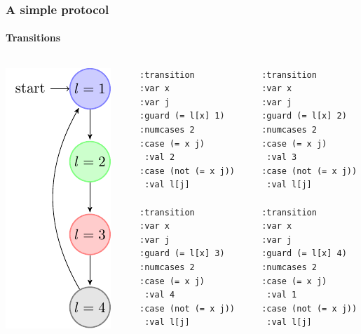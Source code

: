\begin{frame}[fragile]
  \frametitle{A simple protocol}
  \framesubtitle{Transitions}

  \begin{columns}
  \begin{column}{0.3\textwidth}
  \centering
  \includegraphics{pictures/demo-prot1-fig}
  \end{column}
  \begin{column}{0.7\textwidth}
  
\begin{columns}
\begin{column}{0.35\textwidth}
 {\scriptsize 
  \begin{verbatim}
  :transition
  :var x
  :var j
  :guard (= l[x] 1)
  :numcases 2
  :case (= x j)
   :val 2
  :case (not (= x j))
   :val l[j]

  :transition
  :var x
  :var j
  :guard (= l[x] 3)
  :numcases 2
  :case (= x j)
   :val 4
  :case (not (= x j))
   :val l[j]
 \end{verbatim}
 }
\end{column}
\begin{column}{0.35\textwidth}
 {\scriptsize 
  \begin{verbatim}
  :transition
  :var x
  :var j
  :guard (= l[x] 2)
  :numcases 2
  :case (= x j)
   :val 3
  :case (not (= x j))
   :val l[j]
  
  :transition
  :var x
  :var j
  :guard (= l[x] 4)
  :numcases 2
  :case (= x j)
   :val 1
  :case (not (= x j))
   :val l[j]
 \end{verbatim}
 }
\end{column}

\end{columns}  

\end{column}

\end{columns}

\end{frame}

